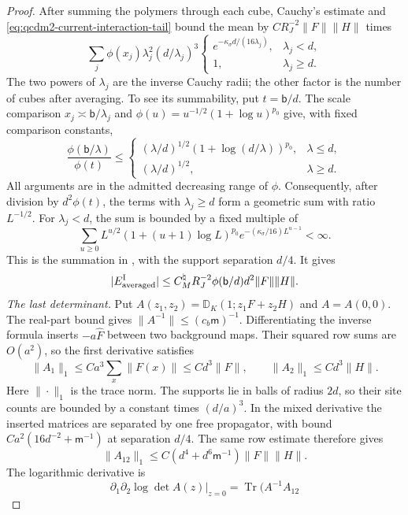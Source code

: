 \documentclass[11pt,letterpaper,reqno]{amsart}
\theoremstyle{definition}
\theoremstyle{remark}
\begin{document}
\begin{proof}
After summing the polymers through each cube,
Cauchy's estimate and
\eqref{eq:qcdm2-current-interaction-tail} bound the
mean by $C R_J^{-2}\|F\|\|H\|$ times
\begin{equation}\label{eq:qcdm2-current-level-sum}
 \sum_j\phi(x_j)\lambda_j^2(d/\lambda_j)^3
 \begin{cases}
 e^{-\kappa_\sigma d/(16\lambda_j)},&\lambda_j<d,\\
 1,&\lambda_j\ge d.
 \end{cases}
\end{equation}
The two powers of $\lambda_j$ are the inverse Cauchy
radii; the other factor is the number of cubes after
averaging. To see its summability, put $t=\mathsf b/d$.
The scale comparison $x_j\asymp\mathsf b/\lambda_j$
and $\phi(u)=u^{-1/2}(1+\log u)^{p_0}$ give, with
fixed comparison constants,
\[
 \frac{\phi(\mathsf b/\lambda)}{\phi(t)}
 \le
 \begin{cases}
 (\lambda/d)^{1/2}(1+\log(d/\lambda))^{p_0},&\lambda\le d,\\
 (\lambda/d)^{1/2},&\lambda\ge d.
 \end{cases}
\]
All arguments are in the admitted decreasing range of
$\phi$. Consequently, after division by $d^2\phi(t)$,
the terms with $\lambda_j\ge d$ form a geometric sum
with ratio $L^{-1/2}$. For $\lambda_j<d$, the sum is
bounded by a fixed multiple of
\[
 \sum_{u\ge0}L^{u/2}(1+(u+1)\log L)^{p_0}
                e^{-(\kappa_\sigma/16)L^{u-1}}<\infty.
\]
This is the summation in \cite[Lem. 11.6]{QCDM1},
with the support separation $d/4$. It gives
\[
 |E^{\rm I}_{\rm averaged}|
       \le C_M^\natural R_J^{-2}\phi(\mathsf b/d)
                                      d^2\|F\|\|H\|.
\]
\emph{The last determinant.}
Put $A(z_1,z_2)=\mathbb D_K(1;z_1F+z_2H)$ and
$A=A(0,0)$. The real-part bound gives
$\|A^{-1}\|\le(c_b\mathsf m)^{-1}$.
Differentiating the inverse formula inserts $-a\hat F$
between two background maps. Their squared row sums
are $O(a^2)$, so the first derivative satisfies
\[
 \|A_1\|_1\le Ca^3\sum_x\|F(x)\|
       \le Cd^3\|F\|,
 \qquad \|A_2\|_1\le Cd^3\|H\|.
\]
Here $\|\cdot\|_1$ is the trace norm. The supports lie
in balls of radius $2d$, so their site counts are
bounded by a constant times $(d/a)^3$.
In the mixed derivative the inserted matrices are
separated by one free propagator, with bound
$Ca^2(16d^{-2}+\mathsf m^{-1})$ at separation $d/4$.
The same row estimate therefore gives
\[
 \|A_{12}\|_1
 \le C(d^4+d^6\mathsf m^{-1})\|F\|\|H\|.
\]
The logarithmic derivative is
\[
 \partial_1\partial_2\log\det A(z)\big|_{z=0}
 =\operatorname{Tr}(A^{-1}A_{12}
\]
\end{proof}
\end{document}
